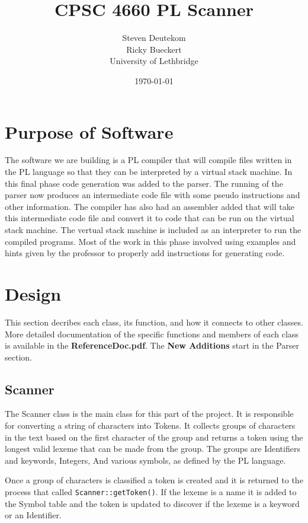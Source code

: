 \documentclass{article}
\begin{document}
\title{CPSC 4660 PL Scanner}
\author{Steven Deutekom\\
        Ricky Bueckert\\
        University of Lethbridge}
\date{\today}

\maketitle

\section{Purpose of Software}
The software we are building is a PL compiler that will compile files written
in the PL language so that they can be interpreted by a virtual stack machine.
In this final phase code generation was added to the parser. The running of
the parser now produces an intermediate code file with some pseudo instructions
and other information. The compiler has also had an assembler added that will
take this intermediate code file and convert it to code that can be run on
the virtual stack machine. The vertual stack machine is included as an interpreter
to run the compiled programs. Most of the work in this phase involved using
examples and hints given by the professor to properly add instructions for
generating code.


\section{Design}
This section decribes each class, its function, and how it connects to other classes.
More detailed documentation of the specific functions and members of each class
is available in the \textbf{ReferenceDoc.pdf}. The \textbf{New Additions} start in the
Parser section.

\subsection{Scanner}
The Scanner class is the main class for this part of the project. It is responsible
for converting a string of characters into Tokens. It collects groups of characters
in the text based on the first character of the group and returns a token
using the longest valid lexeme that can be made from the group. The groups
are Identifiers and keywords, Integers, And various symbols, as defined by the
PL language.

Once a group of characters is classified a token is created and it is returned
to the process that called \verb|Scanner::getToken()|. If the lexeme is a name
it is added to the Symbol table and the token is updated to discover if the
lexeme is a keyword or an Identifier.
\end{document}
